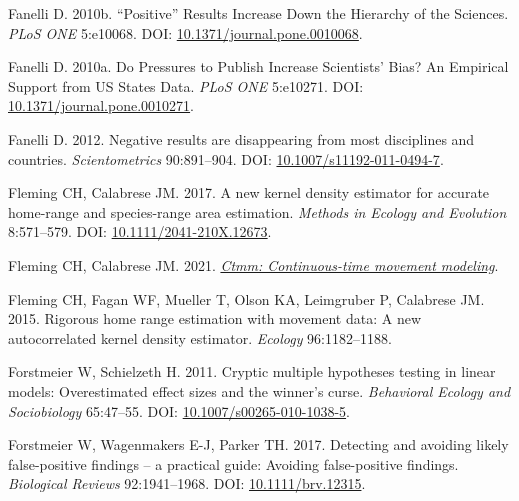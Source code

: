 \documentclass[10pt,a4paper]{article}
\newlength{\cslhangindent}
\newlength{\cslentryspacingunit} %
\newenvironment{CSLReferences}[2] %
 {%
  \setlength{\parindent}{0pt}
  \ifodd #1
  \let\oldpar\par
  \def\par{\hangindent=\cslhangindent\oldpar}
  \fi
  \setlength{\parskip}{#2\cslentryspacingunit}
 }%
 {}
\begin{document}
\begin{CSLReferences}{1}{0}
\leavevmode{}%
Fanelli D. 2010b. {``{Positive}''} {Results} {Increase} {Down} the {Hierarchy} of the {Sciences}. \emph{PLoS ONE} 5:e10068. DOI: \href{https://doi.org/10.1371/journal.pone.0010068}{10.1371/journal.pone.0010068}.

\leavevmode{}%
Fanelli D. 2010a. Do {Pressures} to {Publish} {Increase} {Scientists}' {Bias}? {An} {Empirical} {Support} from {US} {States} {Data}. \emph{PLoS ONE} 5:e10271. DOI: \href{https://doi.org/10.1371/journal.pone.0010271}{10.1371/journal.pone.0010271}.

\leavevmode{}%
Fanelli D. 2012. Negative results are disappearing from most disciplines and countries. \emph{Scientometrics} 90:891--904. DOI: \href{https://doi.org/10.1007/s11192-011-0494-7}{10.1007/s11192-011-0494-7}.

\leavevmode{}%
Fleming CH, Calabrese JM. 2017. A new kernel density estimator for accurate home-range and species-range area estimation. \emph{Methods in Ecology and Evolution} 8:571--579. DOI: \href{https://doi.org/10.1111/2041-210X.12673}{10.1111/2041-210X.12673}.

\leavevmode{}%
Fleming CH, Calabrese JM. 2021. \emph{\href{https://CRAN.R-project.org/package=ctmm}{Ctmm: Continuous-time movement modeling}}.

\leavevmode{}%
Fleming CH, Fagan WF, Mueller T, Olson KA, Leimgruber P, Calabrese JM. 2015. Rigorous home range estimation with movement data: {A} new autocorrelated kernel density estimator. \emph{Ecology} 96:1182--1188.

\leavevmode{}%
Forstmeier W, Schielzeth H. 2011. Cryptic multiple hypotheses testing in linear models: Overestimated effect sizes and the winner's curse. \emph{Behavioral Ecology and Sociobiology} 65:47--55. DOI: \href{https://doi.org/10.1007/s00265-010-1038-5}{10.1007/s00265-010-1038-5}.

\leavevmode{}%
Forstmeier W, Wagenmakers E-J, Parker TH. 2017. Detecting and avoiding likely false-positive findings -- a practical guide: {Avoiding} false-positive findings. \emph{Biological Reviews} 92:1941--1968. DOI: \href{https://doi.org/10.1111/brv.12315}{10.1111/brv.12315}.


\end{CSLReferences}
\end{document}
